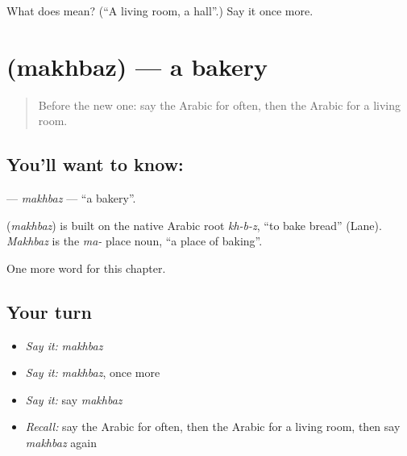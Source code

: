 \begin{tcolorbox}[breakable,colback=teal!4,colframe=teal!35!black,title={Before you move on}]
What does  mean? (\textquotedblleft{}A living room, a hall\textquotedblright{}.) Say it once more.
\end{tcolorbox}
\section[\texorpdfstring{\ar{مخبز} (makhbaz)}{مخبز (makhbaz)}]{ (makhbaz) — a bakery}

\label{lesson:AR-C172-makhbaz}



\begin{quote}
Before the new one: say the Arabic for often, then the Arabic for a living room.
\end{quote}

\subsection*{You'll want to know: }
\textbf{} — \emph{makhbaz} — \textquotedblleft{}a bakery\textquotedblright{}.

\begin{cousinweb}
\textbf{} (\emph{makhbaz}) is built on the native Arabic root \emph{kh-b-z}, \textquotedblleft{}to bake bread\textquotedblright{} (Lane). \emph{Makhbaz} is the \emph{ma-} place noun, \textquotedblleft{}a place of baking\textquotedblright{}.
\end{cousinweb}

\begin{grammarlens}[title={What you've built}]
One more word for this chapter.
\end{grammarlens}

\subsection*{Your turn}
\begin{itemize}
\raggedright
  \item \emph{Say it:} \emph{makhbaz}
  \item \emph{Say it:} \emph{makhbaz}, once more
  \item \emph{Say it:} say \emph{makhbaz}
  \item \emph{Recall:} say the Arabic for often, then the Arabic for a living room, then say \emph{makhbaz} again
\end{itemize}

